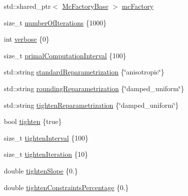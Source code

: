 \begin{DoxyCompactItemize}
\item 
std\+::shared\+\_\+ptr$<$ \hyperlink{classnifty_1_1graph_1_1opt_1_1multicut_1_1MulticutMp_ab1974bc35fb66895a3a7bfc820f9b78d}{Mc\+Factory\+Base} $>$ \hyperlink{structnifty_1_1graph_1_1opt_1_1multicut_1_1MulticutMp_1_1SettingsType_ab4716729830156eee7fc8c8a89843d1e}{mc\+Factory}
\item 
size\+\_\+t \hyperlink{structnifty_1_1graph_1_1opt_1_1multicut_1_1MulticutMp_1_1SettingsType_acd188278b943ad0edb41a58b786e1898}{number\+Of\+Iterations} \{1000\}
\item 
int \hyperlink{structnifty_1_1graph_1_1opt_1_1multicut_1_1MulticutMp_1_1SettingsType_af20cc3665c9b182f48ef579db1e13037}{verbose} \{0\}
\item 
size\+\_\+t \hyperlink{structnifty_1_1graph_1_1opt_1_1multicut_1_1MulticutMp_1_1SettingsType_a55bd7a96b1f41b8e29e995c44d5e971b}{primal\+Computation\+Interval} \{100\}
\item 
std\+::string \hyperlink{structnifty_1_1graph_1_1opt_1_1multicut_1_1MulticutMp_1_1SettingsType_a7527f07537f1976d0bdf2dfb690a1564}{standard\+Reparametrization} \{\char`\"{}anisotropic\char`\"{}\}
\item 
std\+::string \hyperlink{structnifty_1_1graph_1_1opt_1_1multicut_1_1MulticutMp_1_1SettingsType_ac8c10ffcf7711bd519925aa15ca5ddbf}{rounding\+Reparametrization} \{\char`\"{}damped\+\_\+uniform\char`\"{}\}
\item 
std\+::string \hyperlink{structnifty_1_1graph_1_1opt_1_1multicut_1_1MulticutMp_1_1SettingsType_ab132601471a33b274c8fd199ab82ea1b}{tighten\+Reparametrization} \{\char`\"{}damped\+\_\+uniform\char`\"{}\}
\item 
bool \hyperlink{structnifty_1_1graph_1_1opt_1_1multicut_1_1MulticutMp_1_1SettingsType_a064510136f7bde5f3a348924be055fe6}{tighten} \{true\}
\item 
size\+\_\+t \hyperlink{structnifty_1_1graph_1_1opt_1_1multicut_1_1MulticutMp_1_1SettingsType_ac7ed9faae33f94bd95afa3e6a8c03b7f}{tighten\+Interval} \{100\}
\item 
size\+\_\+t \hyperlink{structnifty_1_1graph_1_1opt_1_1multicut_1_1MulticutMp_1_1SettingsType_a15aae9da2f588cc2e8fc9a22f1898098}{tighten\+Iteration} \{10\}
\item 
double \hyperlink{structnifty_1_1graph_1_1opt_1_1multicut_1_1MulticutMp_1_1SettingsType_a7a9bbfdbdce8c640af5182f506d744e1}{tighten\+Slope} \{0.\}
\item 
double \hyperlink{structnifty_1_1graph_1_1opt_1_1multicut_1_1MulticutMp_1_1SettingsType_ab2e133d14603e72672e5b6428864d899}{tighten\+Constraints\+Percentage} \{0.\}

\end{DoxyCompactItemize}
